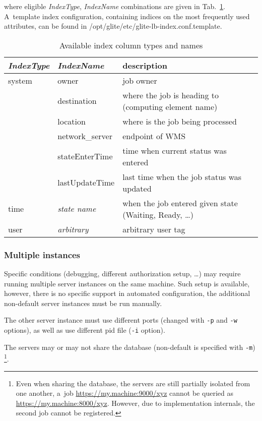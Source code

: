 where eligible \emph{IndexType}, \emph{IndexName} combinations are given
in Tab.~\ref{t:indexcols}.
A~template index configuration, containing indices on the most frequently
used attributes, can be found in /opt/glite/etc/glite-lb-index.conf.template.


\begin{table}
\begin{center}
\begin{tabularx}{.9\hsize}{|l|l|X|}
\hline
\emph{IndexType} & \emph{IndexName} & description \\
\hline
system & owner & job owner \\
 & destination & where the job is heading to (computing element name) \\
 & location & where is the job being processed \\
 & network\_server & endpoint of WMS \\
 & stateEnterTime & time when current status was entered \\
 & lastUpdateTime & last time when the job status was updated \\
\hline
time & \emph{state name} & when the job entered given state (Waiting, Ready, \dots) \\
\hline
user & \emph{arbitrary} & arbitrary user tag \\
\hline
\end{tabularx}
\end{center}
\caption{Available index column types and names}
\label{t:indexcols}
\end{table}


\subsubsection{Multiple instances}


Specific conditions (\eg debugging, different authorization setup, \dots)
may require running multiple \LB server instances
on the same machine.
Such setup is available, however, there is no specific support in automated
configuration, the additional non-default server instances must be run manually.

The other server instance must use different ports (changed with \verb'-p'
and \verb'-w' options), as well as use different pid file (\verb'-i' option).

The servers may or may not share the database (non-default is specified
with  \verb'-m')%
\footnote{Even when sharing the database, the servers are still 
partially isolated from
one another, \eg a~job \url{https://my.machine:9000/xyz} cannot be queried 
as \url{https://my.machine:8000/xyz}.
However, due to implementation internals, the second job cannot be registered.}.

